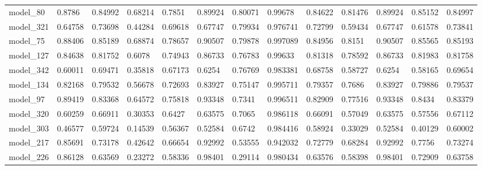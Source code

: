 \begin{tabular}{lllllllllllll}
model\_80      & 0.8786      & 0.84992        & 0.68214      & 0.7851           & 0.89924              & 0.80071              & 0.99678      & 0.84622           & 0.81476            & 0.89924         & 0.85152     & 0.84997      \\
model\_321     & 0.64758     & 0.73698        & 0.44284      & 0.69618          & 0.67747              & 0.79934              & 0.976741     & 0.72799           & 0.59434            & 0.67747         & 0.61578     & 0.73841      \\
model\_75      & 0.88406     & 0.85189        & 0.68874      & 0.78657          & 0.90507              & 0.79878              & 0.997089     & 0.84956           & 0.8151             & 0.90507         & 0.85565     & 0.85193      \\
model\_127     & 0.84638     & 0.81752        & 0.6078       & 0.74943          & 0.86733              & 0.76783              & 0.99633      & 0.81318           & 0.78592            & 0.86733         & 0.81983     & 0.81758      \\
model\_342     & 0.60011     & 0.69471        & 0.35818      & 0.67173          & 0.6254               & 0.76769              & 0.983381     & 0.68758           & 0.58727            & 0.6254          & 0.58165     & 0.69654      \\
model\_134     & 0.82168     & 0.79532        & 0.56678      & 0.72693          & 0.83927              & 0.75147              & 0.995711     & 0.79357           & 0.7686             & 0.83927         & 0.79886     & 0.79537      \\
model\_97      & 0.89419     & 0.83368        & 0.64572      & 0.75818          & 0.93348              & 0.7341               & 0.996511     & 0.82909           & 0.77516            & 0.93348         & 0.8434      & 0.83379      \\
model\_320     & 0.60259     & 0.66911        & 0.30353      & 0.6427           & 0.63575              & 0.7065               & 0.986118     & 0.66091           & 0.57049            & 0.63575         & 0.57556     & 0.67112      \\
model\_303     & 0.46577     & 0.59724        & 0.14539      & 0.56367          & 0.52584              & 0.6742               & 0.984416     & 0.58924           & 0.33029            & 0.52584         & 0.40129     & 0.60002      \\
model\_217     & 0.85691     & 0.73178        & 0.42642      & 0.66654          & 0.92992              & 0.53555              & 0.942032     & 0.72779           & 0.68284            & 0.92992         & 0.7756      & 0.73274      \\
model\_226     & 0.86128     & 0.63569        & 0.23272      & 0.58336          & 0.98401              & 0.29114              & 0.980434     & 0.63576           & 0.58398            & 0.98401         & 0.72909     & 0.63758
\end{tabular}